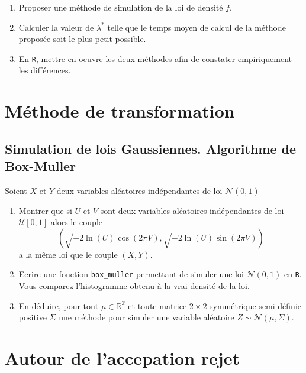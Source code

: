 \documentclass[]{article}
\providecommand{\tightlist}{%
  \setlength{\itemsep}{0pt}\setlength{\parskip}{0pt}}
\begin{document}
\begin{enumerate}
\def\labelenumi{\arabic{enumi}.}
\setcounter{enumi}{3}
\item
  Proposer une méthode de simulation de la loi de densité \(f\).
\item
  Calculer la valeur de \(\lambda^*\) telle que le temps moyen de calcul
  de la méthode proposée soit le plus petit possible.
\item
  En \texttt{R}, mettre en oeuvre les deux méthodes afin de constater
  empiriquement les différences.
\end{enumerate}

\hypertarget{muxe9thode-de-transformation}{%
\section{Méthode de transformation}\label{muxe9thode-de-transformation}}

\hypertarget{simulation-de-lois-gaussiennes.-algorithme-de-box-muller}{%
\subsection{Simulation de lois Gaussiennes. Algorithme de
Box-Muller}\label{simulation-de-lois-gaussiennes.-algorithme-de-box-muller}}

Soient \(X\) et \(Y\) deux variables aléatoires indépendantes de loi
\(\mathcal{N}(0, 1)\)

\begin{enumerate}
\def\labelenumi{\arabic{enumi}.}
\tightlist
\item
  Montrer que si \(U\) et \(V\) sont deux variables aléatoires
  indépendantes de loi \(\mathcal{U}[0, 1]\) alors le couple
  \[\left(\sqrt{- 2 \ln(U)} \cos (2\pi V), \sqrt{- 2 \ln(U)} \sin(2\pi V)\right)\]
  a la même loi que le couple \((X, Y)\).
\item
  Ecrire une fonction \texttt{box\_muller} permettant de simuler une loi
  \(\mathcal{N}(0, 1)\) en \texttt{R}. Vous comparez l'histogramme
  obtenu à la vrai densité de la loi.
\item
  En déduire, pour tout \(\mu \in \mathbb{R^2}\) et toute matrice
  \(2\times 2\) symmétrique semi-définie positive \(\Sigma\) une méthode
  pour simuler une variable aléatoire
  \(Z\sim \mathcal{N}(\mu, \Sigma)\).
\end{enumerate}

\hypertarget{autour-de-laccepation-rejet}{%
\section{Autour de l'accepation
rejet}\label{autour-de-laccepation-rejet}}
\end{document}
